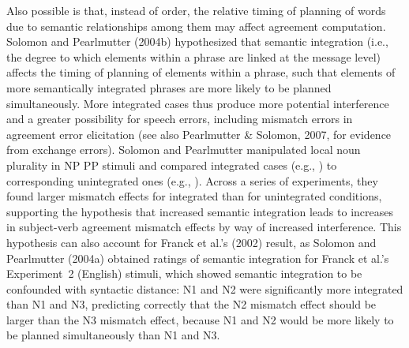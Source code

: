 \documentclass[12pt,titlepage]{article}
\begin{document}
Also possible is that, instead of order, the relative timing of planning of
words due to semantic relationships among them may affect agreement
computation.  Solomon and Pearlmutter (2004b) hypothesized that semantic
integration (i.e., the degree to which elements within a phrase are linked
at the message level) affects the timing of planning of elements within a
phrase, such that elements of more semantically integrated phrases are more
likely to be planned simultaneously.  More integrated cases thus produce
more potential interference and a greater possibility for speech errors,
including mismatch errors in agreement error elicitation (see also
Pearlmutter \& Solomon, 2007, for evidence from exchange errors).  Solomon
and Pearlmutter manipulated local noun plurality in NP PP stimuli and
compared integrated cases (e.g., )
to corresponding unintegrated ones (e.g., ).  Across a series of experiments, they found larger mismatch
effects for integrated than for unintegrated conditions, supporting the
hypothesis that increased semantic integration leads to increases in
subject-verb agreement mismatch effects by way of increased interference.
This hypothesis can also account for Franck et al.'s (2002) result, as
Solomon and Pearlmutter (2004a) obtained ratings of semantic integration
for Franck et al.'s Experiment~2 (English) stimuli, which showed semantic
integration to be confounded with syntactic distance: N1 and N2 were
significantly more integrated than N1 and N3, predicting correctly that the
N2 mismatch effect should be larger than the N3 mismatch effect, because N1
and N2 would be more likely to be planned simultaneously than N1 and N3.
\end{document}
